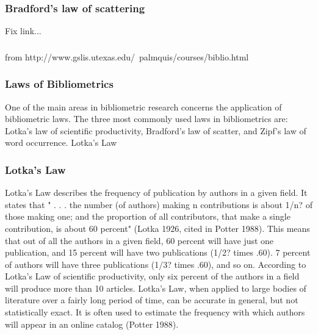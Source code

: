 \begin{frame}
  \frametitle{Bradford's law of scattering}

  Fix link...
\end{frame}

\begin{frame}
  \frametitle{}

  from
http://www.gslis.utexas.edu/~palmquis/courses/biblio.html

\end{frame}

\begin{frame}
  \frametitle{Laws of Bibliometrics}

  One of the main areas in bibliometric research concerns the
  application of bibliometric laws. The three most commonly used laws in
  bibliometrics are: Lotka's law of scientific productivity, Bradford's
  law of scatter, and Zipf's law of word occurrence.  Lotka's Law

\end{frame}

\begin{frame}
  \frametitle{Lotka's Law}

  Lotka's Law describes the frequency of publication by authors in a
  given field. It states that " . . . the number (of authors) making n
  contributions is about 1/n? of those making one; and the proportion
  of all contributors, that make a single contribution, is about 60
  percent" (Lotka 1926, cited in Potter 1988). This means that out of
  all the authors in a given field, 60 percent will have just one
  publication, and 15 percent will have two publications (1/2? times
  .60). 7 percent of authors will have three publications (1/3? times
  .60), and so on. According to Lotka's Law of scientific
  productivity, only six percent of the authors in a field will
  produce more than 10 articles. Lotka's Law, when applied to large
  bodies of literature over a fairly long period of time, can be
  accurate in general, but not statistically exact. It is often used
  to estimate the frequency with which authors will appear in an
  online catalog (Potter 1988).

\end{frame}

